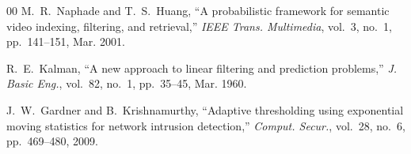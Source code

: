 \documentclass[conference]{IEEEtran}
\begin{document}
\begin{thebibliography}{00}
M.~R.~Naphade and T.~S.~Huang, ``A probabilistic framework for semantic
video indexing, filtering, and retrieval,'' \textit{IEEE Trans. Multimedia},
vol.~3, no.~1, pp.~141--151, Mar. 2001.

R.~E.~Kalman, ``A new approach to linear filtering and prediction
problems,'' \textit{J. Basic Eng.}, vol.~82, no.~1, pp.~35--45,
Mar. 1960.

J.~W.~Gardner and B.~Krishnamurthy, ``Adaptive thresholding using
exponential moving statistics for network intrusion detection,''
\textit{Comput. Secur.}, vol.~28, no.~6, pp.~469--480, 2009.

\end{thebibliography}
\end{document}
